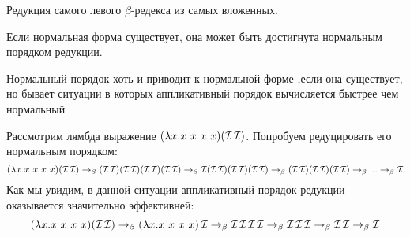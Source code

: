 \begin{definition}
	Редукция самого левого $\beta$-редекса из самых вложенных.
\end{definition}

\begin{theorem}
	Если нормальная форма существует, она может быть достигнута нормальным порядком редукции.
\end{theorem}

Нормальный порядок хоть и приводит к нормальной форме ,если она существует, но бывает ситуации в которых аппликативный порядок вычисляется быстрее чем нормальный

\begin{example}
	Рассмотрим лямбда выражение $(\lambda{}x.x \ x \ x \ x) (\comb I \comb I)$. Попробуем редуцировать его нормальным порядком:
	 \[(\lambda{}x.x \ x \ x \ x) (\comb I \comb I) \to_{\beta} (\comb I \comb I)(\comb I \comb I)(\comb I \comb I)(\comb I \comb I) \to_{\beta} \comb I(\comb I \comb I)(\comb I \comb I)(\comb I \comb I) \to_{\beta} (\comb I \comb I)(\comb I \comb I)(\comb I \comb I) \to_{\beta} ... \to_{\beta} \comb I\] 
	Как мы увидим, в данной ситуации аппликативный порядок редукции оказывается значительно эффективней: 
	\[ (\lambda{}x.x \ x \ x \ x) (\comb I \comb I) \to_{\beta} (\lambda{}x.x \ x \ x \ x) \comb I \to_{\beta} \comb I \comb I \comb I \comb I\to_{\beta} \comb I \comb I \comb I \to_{\beta} \comb I \comb I \to_{\beta} \comb I \]
\end{example}
